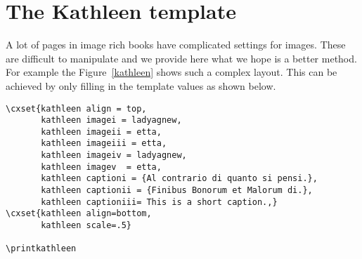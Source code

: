 



\begin{center}\printkathleen\par\label{kathleen}\end{center}

\newpage

\section{The Kathleen template} 

A lot of pages in image rich books have complicated settings for images.
These are difficult to manipulate and we provide here what we hope is
a better method. For example the Figure~\ref{kathleen} shows such a complex layout. This can be achieved by only filling in the template
values as shown below.

\begin{tcolorbox}
\begin{lstlisting}
\cxset{kathleen align = top,
       kathleen imagei = ladyagnew,
       kathleen imageii = etta,
       kathleen imageiii = etta,
       kathleen imageiv = ladyagnew,
       kathleen imagev  = etta,
       kathleen captioni = {Al contrario di quanto si pensi.}, 
       kathleen captionii = {Finibus Bonorum et Malorum di.},
       kathleen captioniii= This is a short caption.,} 
\cxset{kathleen align=bottom,
       kathleen scale=.5}

\printkathleen

\end{lstlisting}
\end{tcolorbox}



\clearpage


\parindent0pt
\pagestyle{empty}


